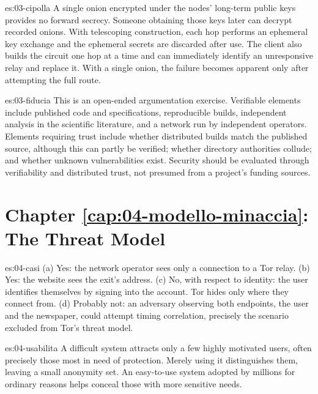 \begin{soluzione}{es:03-cipolla}
A single onion encrypted under the nodes' long-term public keys provides no forward secrecy. Someone obtaining those keys later can decrypt recorded onions. With telescoping construction, each hop performs an ephemeral key exchange and the ephemeral secrets are discarded after use. The client also builds the circuit one hop at a time and can immediately identify an unresponsive relay and replace it. With a single onion, the failure becomes apparent only after attempting the full route.
\end{soluzione}

\begin{soluzione}{es:03-fiducia}
This is an open-ended argumentation exercise. Verifiable elements include published code and specifications, reproducible builds, independent analysis in the scientific literature, and a network run by independent operators. Elements requiring trust include whether distributed builds match the published source, although this can partly be verified; whether directory authorities collude; and whether unknown vulnerabilities exist. Security should be evaluated through verifiability and distributed trust, not presumed from a project's funding sources.
\end{soluzione}

\section*{Chapter \ref{cap:04-modello-minaccia}: The Threat Model}

\begin{soluzione}{es:04-casi}
(a) Yes: the network operator sees only a connection to a Tor relay. (b) Yes: the website sees the exit's address. (c) No, with respect to identity: the user identifies themselves by signing into the account. Tor hides only where they connect from. (d) Probably not: an adversary observing both endpoints, the user and the newspaper, could attempt timing correlation, precisely the scenario excluded from Tor's threat model.
\end{soluzione}

\begin{soluzione}{es:04-usabilita}
A difficult system attracts only a few highly motivated users, often precisely those most in need of protection. Merely using it distinguishes them, leaving a small anonymity set. An easy-to-use system adopted by millions for ordinary reasons helps conceal those with more sensitive needs.
\end{soluzione}

